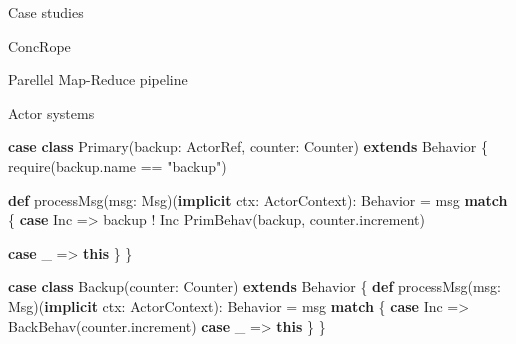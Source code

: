 \documentclass[
  ignorenonframetext,
]{beamer}
\newenvironment{Shaded}{}{}
\newcommand{\FunctionTok}[1]{\textcolor[rgb]{0.02,0.16,0.49}{#1}}
\newcommand{\KeywordTok}[1]{\textcolor[rgb]{0.00,0.44,0.13}{\textbf{#1}}}
\newcommand{\NormalTok}[1]{#1}
\newcommand{\StringTok}[1]{\textcolor[rgb]{0.25,0.44,0.63}{#1}}
\begin{document}
\begin{frame}[fragile]{Case studies}
\protect\hypertarget{case-studies}{}

\begin{block}{ConcRope}

\end{block}

\begin{block}{Parellel Map-Reduce pipeline}

\end{block}

\begin{block}{Actor systems}

\begin{Shaded}
\begin{Highlighting}[]
  \KeywordTok{case} \KeywordTok{class} \FunctionTok{Primary}\NormalTok{(backup: ActorRef, counter: Counter) }\KeywordTok{extends}\NormalTok{ Behavior \{}
    \FunctionTok{require}\NormalTok{(backup.}\FunctionTok{name}\NormalTok{ == }\StringTok{"backup"}\NormalTok{)}

    \KeywordTok{def} \FunctionTok{processMsg}\NormalTok{(msg: Msg)(}\KeywordTok{implicit}\NormalTok{ ctx: ActorContext): Behavior = msg }\KeywordTok{match}\NormalTok{ \{}
      \KeywordTok{case}\NormalTok{ Inc =>}
\NormalTok{        backup ! Inc}
        \FunctionTok{PrimBehav}\NormalTok{(backup, counter.}\FunctionTok{increment}\NormalTok{)}

      \KeywordTok{case}\NormalTok{ _ => }\KeywordTok{this}
\NormalTok{    \}}
\NormalTok{  \}}
\end{Highlighting}
\end{Shaded}

\begin{Shaded}
\begin{Highlighting}[]
  \KeywordTok{case} \KeywordTok{class} \FunctionTok{Backup}\NormalTok{(counter: Counter) }\KeywordTok{extends}\NormalTok{ Behavior \{}
    \KeywordTok{def} \FunctionTok{processMsg}\NormalTok{(msg: Msg)(}\KeywordTok{implicit}\NormalTok{ ctx: ActorContext): Behavior = msg }\KeywordTok{match}\NormalTok{ \{}
      \KeywordTok{case}\NormalTok{ Inc => }\FunctionTok{BackBehav}\NormalTok{(counter.}\FunctionTok{increment}\NormalTok{)}
      \KeywordTok{case}\NormalTok{ _ => }\KeywordTok{this}
\NormalTok{    \}}
\NormalTok{  \}}
\end{Highlighting}
\end{Shaded}


\end{block}
\end{frame}
\end{document}
